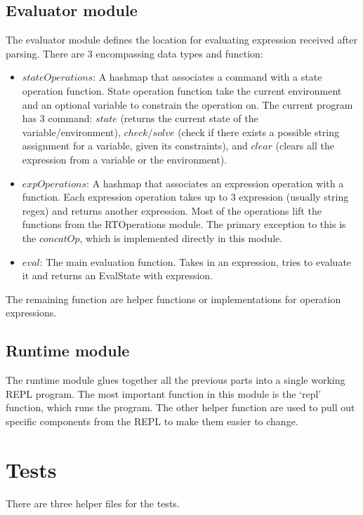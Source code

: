\documentclass[letterpaper, 11pt]{article}
\begin{document}
\subsection{Evaluator module}\label{code:eval}
The evaluator module defines the location for evaluating expression received after parsing. There are 3 encompassing data types and function:
\begin{itemize}[itemsep=-0.3em]
    \item $stateOperations$: A hashmap that associates a command with a state operation function. State operation function take the current environment and an optional variable to constrain the operation on. The current program has 3 command: $state$ (returns the current state of the variable/environment), $check$/$solve$ (check if there exists a possible string assignment for a variable, given its constraints), and $clear$ (clears all the expression from a variable or the environment). 
    \item $expOperations$: A hashmap that associates an expression operation with a function. Each expression operation takes up to 3 expression (usually string regex) and returns another expression. Most of the operations lift the functions from the RTOperations module. The primary exception to this is the $concatOp$, which is implemented directly in this module.
    \item $eval$: The main evaluation function. Takes in an expression, tries to evaluate it and returns an EvalState with expression. 
\end{itemize}
The remaining function are helper functions or implementations for operation expressions. 

\subsection{Runtime module}\label{code:runtime}
The runtime module glues together all the previous parts into a single working REPL program.
The most important function in this module is the `repl' function, which runs the program.
The other helper function are used to pull out specific components from the REPL to make them easier to change.

\section{Tests}\label{sec:tests}
There are three helper files for the tests.


\end{document}
